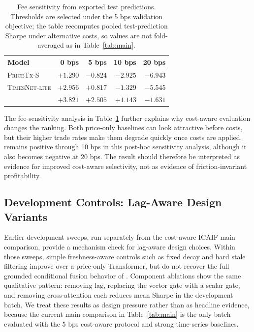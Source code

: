 \begin{table}[tbp]
\caption{Fee sensitivity from exported test predictions. Thresholds are selected under the 5 bps validation objective; the table recomputes pooled test-prediction Sharpe under alternative costs, so values are not fold-averaged as in Table~\ref{tab:main}.}
\label{tab:fees}
\centering
\footnotesize
\setlength{\tabcolsep}{5pt}
\renewcommand{\arraystretch}{1.05}
\begin{tabular}{lrrrr}
\toprule
Model & 0 bps & 5 bps & 10 bps & 20 bps \\
\midrule
\textsc{PriceTx-S} & $+1.290$ & $-0.824$ & $-2.925$ & $-6.943$ \\
\textsc{TimesNet-lite} & $+2.956$ & $+0.817$ & $-1.329$ & $-5.545$ \\
\CGCMA{} & \textbf{$+3.821$} & \textbf{$+2.505$} & \textbf{$+1.143$} & $-1.631$ \\
\bottomrule
\end{tabular}
\end{table}

The fee-sensitivity analysis in Table~\ref{tab:fees} further explains why cost-aware evaluation changes the ranking.
Both price-only baselines can look attractive before costs, but their higher trade rates make them degrade quickly once costs are applied.
\CGCMA{} remains positive through 10 bps in this post-hoc sensitivity analysis, although it also becomes negative at 20 bps.
The result should therefore be interpreted as evidence for improved cost-aware selectivity, not as evidence of friction-invariant profitability.

\subsection{Development Controls: Lag-Aware Design Variants}
\label{sec:design}

Earlier development sweeps, run separately from the cost-aware ICAIF main comparison, provide a mechanism check for lag-aware design choices.
Within those sweeps, simple freshness-aware controls such as fixed decay and hard stale filtering improve over a price-only Transformer, but do not recover the full grounded conditional fusion behavior of \CGCMA{}.
Component ablations show the same qualitative pattern: removing lag, replacing the vector gate with a scalar gate, and removing cross-attention each reduces mean Sharpe in the development batch.
We treat these results as design pressure rather than as headline evidence, because the current main comparison in Table~\ref{tab:main} is the only batch evaluated with the 5 bps cost-aware protocol and strong time-series baselines.

